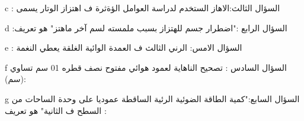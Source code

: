 \documentclass[a4paper]{article}
\begin{document}
\begin{examcopy}
 \begin{arab}\begin{question}{c}
       ‫السؤال الثالث:الاهاز الستخدم لدراسة العوامل الؤةثرة ف اهتزاز الوتار يسمى :‬
    \begin{choiceshoriz}
    \end{choiceshoriz}
  \end{question}\end{arab}

  \begin{arab}\begin{question}{d}
  ‫السؤال الرابع :"اضطرار جسم للهتزاز بسبب ملمسته لسم آخر ماهتز" هو تعريف:‬
    \begin{choices}
    \end{choices}
  \end{question}\end{arab}
  
  
  
 \begin{arab}\begin{question}{e}
 ‫السؤال الامس: الرني الثالث ف العمدة الوائية الغلقة يعطي النغمة :
    \begin{choices}
    \end{choices}
  \end{question}\end{arab}


  \begin{arab}\begin{question}{f}
السؤال السادس : تصحيح الناهاية لعمود هوائي مفتوح نصف قطره 01 سم تساوي (سم):
    \begin{choiceshoriz}[o]
    \end{choiceshoriz}
  \end{question}\end{arab}
  
 \begin{arab}\begin{question}{g}
السؤال السابع:"كمية الطاقة الضوئية الرئية الساقطة عموديا على وحدة الساحات من السطح ف الثانية" هو تعريف :‬
    \begin{choices}
    \end{choices}
  \end{question}\end{arab}
  



\end{examcopy}
\end{document}
